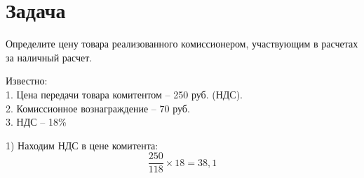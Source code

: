 \section{Задача}
Определите цену товара реализованного комиссионером,
участвующим в расчетах за наличный расчет.

Известно:\\
1. Цена передачи товара комитентом – 250 руб. (НДС).\\
2. Комиссионное вознаграждение – 70 руб.\\
3. НДС – 18\%

1) Находим НДС в цене комитента:
\[ \dfrac{250}{118} \times 18 = 38,1 \]